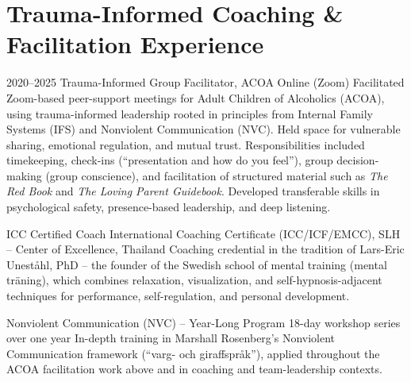 \section{Trauma-Informed Coaching \& Facilitation Experience}

\cventry
  {2020--2025}
  {Trauma-Informed Group Facilitator, ACOA}
  {Online (Zoom)}
  {}
  {}
  {Facilitated Zoom-based peer-support meetings for Adult Children of Alcoholics (ACOA), using trauma-informed leadership rooted in principles from Internal Family Systems (IFS) and Nonviolent Communication (NVC). Held space for vulnerable sharing, emotional regulation, and mutual trust. Responsibilities included timekeeping, check-ins (``presentation and how do you feel''), group decision-making (group conscience), and facilitation of structured material such as \textit{The Red Book} and \textit{The Loving Parent Guidebook}. Developed transferable skills in psychological safety, presence-based leadership, and deep listening.}

\cventry
  {}
  {ICC Certified Coach}
  {International Coaching Certificate (ICC/ICF/EMCC), SLH -- Center of Excellence, Thailand}
  {}
  {}
  {Coaching credential in the tradition of Lars-Eric Uneståhl, PhD -- the founder of the Swedish school of mental training (mental träning), which combines relaxation, visualization, and self-hypnosis-adjacent techniques for performance, self-regulation, and personal development.}

\cventry
  {}
  {Nonviolent Communication (NVC) -- Year-Long Program}
  {18-day workshop series over one year}
  {}
  {}
  {In-depth training in Marshall Rosenberg's Nonviolent Communication framework (``varg- och giraffspr\aa{}k''), applied throughout the ACOA facilitation work above and in coaching and team-leadership contexts.}
